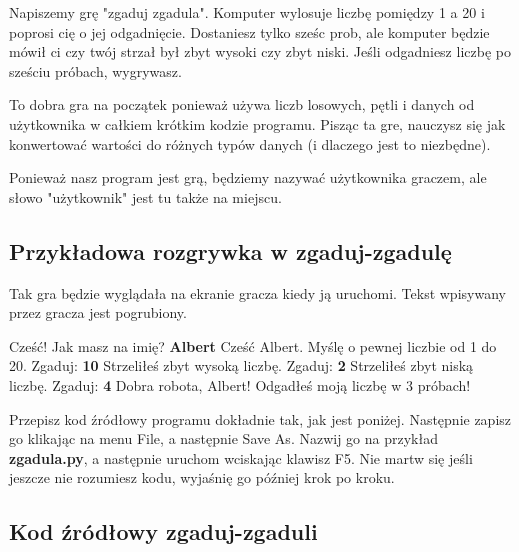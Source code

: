 \documentclass{book}
\begin{document}
Napiszemy grę "zgaduj zgadula". Komputer wylosuje liczbę pomiędzy 1 a 20 i poprosi cię o jej odgadnięcie. Dostaniesz tylko sześc prob, ale komputer będzie mówił ci czy twój strzał był zbyt wysoki czy zbyt niski. Jeśli odgadniesz liczbę po sześciu próbach, wygrywasz.

To dobra gra na początek ponieważ używa liczb losowych, pętli i danych od użytkownika w całkiem krótkim kodzie programu. Pisząc ta gre, nauczysz się jak konwertować wartości do różnych typów danych (i dlaczego jest to niezbędne).

Ponieważ nasz program jest grą, będziemy nazywać użytkownika graczem, ale słowo "użytkownik" jest tu także na miejscu.

\subsection{Przykładowa rozgrywka w zgaduj-zgadulę}

Tak gra będzie wyglądała na ekranie gracza kiedy ją uruchomi. Tekst wpisywany przez gracza jest pogrubiony.

\begin{pseudolisting}
Cześć! Jak masz na imię?\linebreak
{\bf Albert}\linebreak
Cześć Albert. Myślę o pewnej liczbie od 1 do 20.\linebreak
Zgaduj:\linebreak
{\bf 10}\linebreak
Strzeliłeś zbyt wysoką liczbę.\linebreak
Zgaduj:\linebreak
{\bf 2}\linebreak
Strzeliłeś zbyt niską liczbę.\linebreak
Zgaduj:\linebreak
{\bf 4}\linebreak
Dobra robota, Albert! Odgadłeś moją liczbę w 3 próbach!\linebreak
\end{pseudolisting}

Przepisz kod źródłowy programu dokładnie tak, jak jest poniżej. Następnie zapisz go klikając na menu File, a następnie Save As. Nazwij go na przykład {\bf zgadula.py}, a następnie uruchom wciskając klawisz F5. Nie martw się jeśli jeszcze nie rozumiesz kodu, wyjaśnię go później krok po kroku.

\subsection{Kod źródłowy zgaduj-zgaduli}
\end{document}
